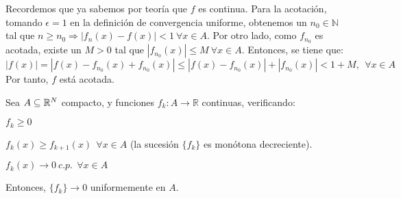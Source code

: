 \begin{sol}
    Recordemos que ya sabemos por teoría que $f$ es continua. Para la acotación, tomando $\epsilon = 1$ en la definición de convergencia uniforme, obtenemos un $n_0 \in \mathbb{N}$ tal que $n \ge n_0 \Rightarrow |f_n(x) - f(x)| < 1\ \forall x \in A$. Por otro lado, como $f_{n_0}$ es acotada, existe un $M>0$ tal que $|f_{n_0}(x)| \le M\ \forall x \in A$. Entonces, se tiene que: $$|f(x)| = |f(x) - f_{n_0}(x) + f_{n_0}(x)| \le |f(x) - f_{n_0}(x)| + |f_{n_0}(x)| < 1 + M, \ \ \forall x \in A$$
    Por tanto, $f$ está acotada.
  \end{sol}

\begin{ejer}
  \label{1}
  Sea $A\subseteq \mathbb{R}^N$ compacto, y funciones $f_k : A \to \mathbb{R}$ continuas, verificando:

  \begin{nlist}
  \item $f_k \geq 0$
  \item $f_k(x) \geq f_{k+1}(x)\ \ \forall x \in A$ (la sucesión $\{f_k\}$ es monótona decreciente).
  \item $f_k(x) \to 0\ c.p.\ \ \forall x \in A$
  \end{nlist}

  Entonces, $\{f_k\} \to 0$ uniformemente en $A$.
\end{ejer}

